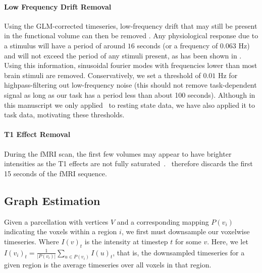 \documentclass[11pt]{article}
\begin{document}
\paragraph{Low Frequency Drift Removal}

Using the GLM-corrected timeseries, low-frequency drift that may still be present in the functional volume can then be removed . Any physiological response due to a stimulus will have a period of around $16$ seconds (or a frequency of $0.063$ Hz) and will not exceed the period of any stimuli present, as has been shown in \cite{Lindquist2009}. Using this information, sinusoidal fourier modes with frequencies lower than most brain stimuli are removed. Conservatively, we set a threshold of $0.01$ Hz for highpass-filtering out low-frequency noise (this should not remove task-dependent signal as long as our task has a period less than about 100 seconds). Although in this manuscript we only applied \ndmg~to resting state data, we have also applied it to task data, motivating these thresholds.

\paragraph{T1 Effect Removal}

During the fMRI scan, the first few volumes may appear to have brighter intensities as the T1 effects are not fully saturated~\cite{Bright2016}. 
\ndmg~therefore discards the first 15 seconds of the fMRI sequence.

\subsection{Graph Estimation}
\label{app:graphgenf}



Given a parcellation with vertices $V$ and a corresponding mapping $P(v_i)$ indicating the voxels within a region $i$, we first must downsample our voxelwise timeseries. Where $I(v)_t$ is the intensity at timestep $t$ for some $v$. Here, we let $I(v_i)_t = \frac{1}{\left|P(v_i)\right|}\sum_{u \in P(v_i)}I(u)_t$, that is, the downsampled timeseries for a given region is  the average timeseries over all voxels in that region.
\end{document}
